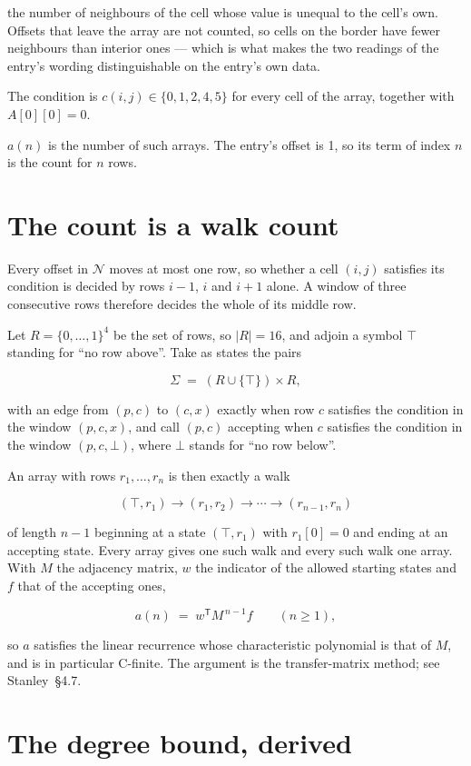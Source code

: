 \documentclass[11pt]{article}
\theoremstyle{definition}
\begin{document}
the number of neighbours of the cell whose value is unequal to the cell's own. Offsets that leave the array are not counted, so cells on the border have fewer neighbours than interior ones --- which is what makes the two readings of the entry's wording distinguishable on the entry's own data.

The condition is $c(i,j) \in \{0, 1, 2, 4, 5\}$ for every cell of the array, together with $A[0][0]=0$.

$a(n)$ is the number of such arrays. The entry's offset is 1, so its term of index $n$ is the count for $n$ rows.

\section{The count is a walk count}

Every offset in $\mathcal{N}$ moves at most one row, so whether a cell $(i,j)$ satisfies its condition is decided by rows $i-1$, $i$ and $i+1$ alone. A window of three consecutive rows therefore decides the whole of its middle row.

Let $R = \{0,\dots,1\}^{4}$ be the set of rows, so $|R| = 16$, and adjoin a symbol $\top$ standing for ``no row above''. Take as states the pairs

\[\Sigma \;=\; (R \cup \{\top\}) \times R,\]

with an edge from $(p,c)$ to $(c,x)$ exactly when row $c$ satisfies the condition in the window $(p,c,x)$, and call $(p,c)$ accepting when $c$ satisfies the condition in the window $(p,c,\bot)$, where $\bot$ stands for ``no row below''.

An array with rows $r_1,\dots,r_n$ is then exactly a walk

\[(\top,r_1) \to (r_1,r_2) \to \cdots \to (r_{n-1},r_n)\]

of length $n-1$ beginning at a state $(\top,r_1)$ with $r_1[0]=0$ and ending at an accepting state. Every array gives one such walk and every such walk one array. With $M$ the adjacency matrix, $w$ the indicator of the allowed starting states and $f$ that of the accepting ones,

\[a(n) \;=\; w^{\mathsf T} M^{\,n-1} f \qquad (n \ge 1),\]

so $a$ satisfies the linear recurrence whose characteristic polynomial is that of $M$, and is in particular C-finite. The argument is the transfer-matrix method; see Stanley~\S4.7.

\section{The degree bound, derived}
\end{document}
